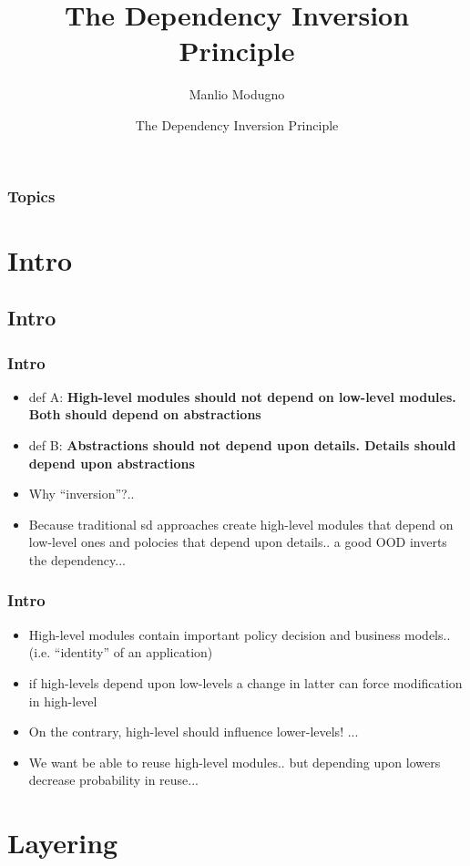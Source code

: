\documentclass{beamer}
\title{The Dependency Inversion Principle}
\author{Manlio Modugno}
\institute[GMTechnologies]
\date[]{The Dependency Inversion Principle}
\begin{document}
\begin{frame}
  \titlepage
\end{frame}

\begin{frame}
  \frametitle{Topics}
  \tableofcontents
\end{frame}


\section{Intro}
\subsection{Intro}
\begin{frame}
  \frametitle{Intro}
  \begin{itemize}
	\item<+-> def A: \textbf{High-level modules should not depend on low-level modules. Both should depend on abstractions}
	\item<+-> def B: \textbf{Abstractions should not depend upon details. Details should depend upon abstractions}
	\item<+-> Why ``inversion''?..
	\item<+-> Because traditional sd approaches create high-level modules that depend on low-level ones and polocies that depend upon details.. a good OOD inverts the dependency...
   \end{itemize}
\end{frame}

\begin{frame}
  \frametitle{Intro}
  \begin{itemize}
	\item<+-> High-level modules contain important policy decision and business models.. (i.e. ``identity'' of an application)
	\item<+-> if high-levels depend upon low-levels a change in latter can force modification in high-level
	\item<+-> On the contrary, high-level should influence lower-levels! ...
	\item<+-> We want be able to reuse high-level modules.. but depending upon lowers decrease probability in reuse...  
   \end{itemize}
\end{frame}

\section{Layering}
\end{document}
